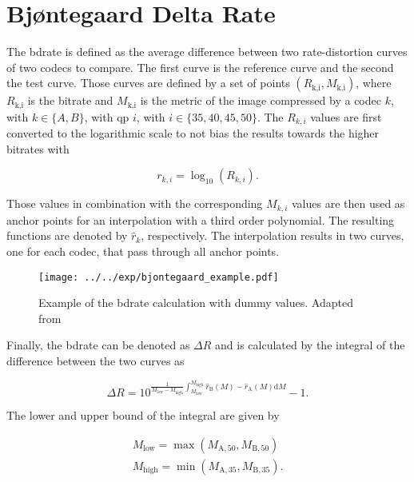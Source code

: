 \section{Bjøntegaard Delta Rate}
\label{subsec:bdrate}

The \gls{bdrate} \cite{bdrate_original_2001}\cite{bdrate_beyond_2022} is defined as the average difference between two rate-distortion curves of two codecs to compare.
The first curve is the reference curve and the second the test curve.
Those curves are defined by a set of points $(R_{\text{k,i}}, M_{\text{k,i}})$, where $R_{\text{k,i}}$ is the bitrate and $M_{\text{k,i}}$ is the metric of the image compressed by a codec $k$, with $k \in \{A,B\}$, with \gls{qp} $i$, with $i \in \{35,40,45,50\}$.
The $R_{k,i}$ values are first converted to the logarithmic scale to not bias the results towards the higher bitrates with

\begin{equation}
    r_{k,i} = \log_{10}\left(R_{k,i}\right).
    \label{eq:log_scale}
\end{equation}

Those values in combination with the corresponding $M_{k,i}$ values are then used as anchor points for an interpolation with a third order polynomial.
The resulting functions are denoted by $\hat{r}_{k}$, respectively.
The interpolation results in two curves, one for each codec, that pass through all anchor points.

\begin{figure}
    \centering
    \texttt{[image: ../../exp/bjontegaard\_example.pdf]}
    \caption{Example of the \gls{bdrate} calculation with dummy values. Adapted from \cite{bdrate_beyond_2022}}
    \label{fig:bdrate_example}
\end{figure}

Finally, the \gls{bdrate} can be denoted as $\Delta R$ and is calculated by the integral of the difference between the two curves as

\begin{equation}
    \Delta R = 10^{\frac{1}{M_{\text{low}}-M_{\text{high}}} \int_{M_{\text{low}}}^{M_{\text{high}}} \hat{r}_{\text{B}}(M) - \hat{r}_{\text{A}}(M) \text{d}M} - 1.
    \label{eq:bdrate}
\end{equation}

The lower and upper bound of the integral are given by

\begin{equation}
    \begin{aligned}
        M_{\text{low}} = \max\left(M_{\text{A},50}, M_{\text{B},50}\right) \\
        M_{\text{high}} = \min\left(M_{\text{A},35}, M_{\text{B},35}\right).
    \end{aligned}
    \label{eq:bounds}
\end{equation}

